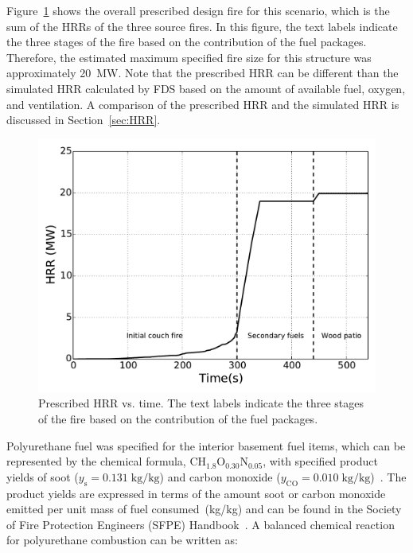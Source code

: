 \documentclass[12pt,oneside]{book}
\renewcommand{\C}{\mbox{C}}
\renewcommand{\H}{\mbox{H}}
\renewcommand{\O}{\mbox{O}}
\newcommand{\N}{\mbox{N}}
\begin{document}
\clearpage


Figure~\ref{fig:hrr} shows the overall prescribed design fire for this scenario, which is the sum of the HRRs of the three source fires. In this figure, the text labels indicate the three stages of the fire based on the contribution of the fuel packages. Therefore, the estimated maximum specified fire size for this structure was approximately 20~MW. Note that the prescribed HRR can be different than the simulated HRR calculated by FDS based on the amount of available fuel, oxygen, and ventilation. A comparison of the prescribed HRR and the simulated HRR is discussed in Section~\ref{sec:HRR}.

\begin{figure}[!ht]
\includegraphics[width=5.5in]{../Figures/Fire_HRR}
\caption[Prescribed HRR vs. time.]
{Prescribed HRR vs. time. The text labels indicate the three stages of the fire based on the contribution of the fuel packages.}
\label{fig:hrr}
\end{figure}

Polyurethane fuel was specified for the interior basement fuel items, which can be represented by the chemical formula, $\C\H_{1.8}\O_{0.30}\N_{0.05}$, with specified product yields of soot ($y_{\mathrm{s}}=0.131 \; \mathrm{kg}/\mathrm{kg}$) and carbon monoxide ($y_{\mathrm{CO}}=0.010 \; \mathrm{kg}/\mathrm{kg}$)~\cite{SFPE:Tewarson}. The product yields are expressed in terms of the amount soot or carbon monoxide emitted per unit mass of fuel consumed~(kg/kg) and can be found in the Society of Fire Protection Engineers (SFPE) Handbook~\cite{SFPE:Tewarson}. A balanced chemical reaction for polyurethane combustion can be written as:
\end{document}

